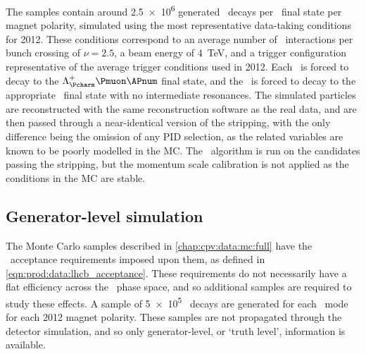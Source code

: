 The samples contain around \num{2.5e6} generated \PLambdab\ decays per 
\PLambdac\ final state per magnet polarity, simulated using the most 
representative data-taking conditions for 2012.
These conditions correspond to an average number of \pp\ interactions per bunch 
crossing of $\nu = 2.5$, a beam energy of \SI{4}{\TeV}, and a trigger 
configuration representative of the average trigger conditions used in 2012.
Each \PLambdab\ is forced to decay to the $\PLambdac\Pmuon\APnum$ final state, 
and the \PLambdac\ is forced to decay to the appropriate \phh\ final state with 
no intermediate resonances.
The simulated particles are reconstructed with the same reconstruction software 
as the real data, and are then passed through a near-identical version of the 
stripping, with the only difference being the omission of any \ac{PID} 
selection, as the related variables are known to be poorly modelled in the 
\ac{MC}.
The \decaytreefitter\ algorithm is run on the candidates passing the stripping, 
but the momentum scale calibration is not applied as the conditions in the 
\ac{MC} are stable.

\subsection{Generator-level simulation}
\label{chap:cpv:data:mc:gen}

The Monte Carlo samples described in \cref{chap:cpv:data:mc:full} have the 
\lhcb\ acceptance requirements imposed upon them, as defined in 
\cref{eqn:prod:data:lhcb_acceptance}.
These requirements do not necessarily have a flat efficiency across the 
\LcTophh\ phase space, and so additional samples are required to study these 
effects.
A sample of \num{5e5} \LbToLcmunu\ decays are generated for each \LcTophh\ mode 
for each 2012 magnet polarity.
These samples are not propagated through the detector simulation, and so only 
generator-level, or `truth level', information is available.

\begin{table}
  \centering
  \caption{%
    Integrated luminosity for each data sample used in the analysis.
  }
  \label{tab:cpv:data:luminosity}
  
\end{table}

